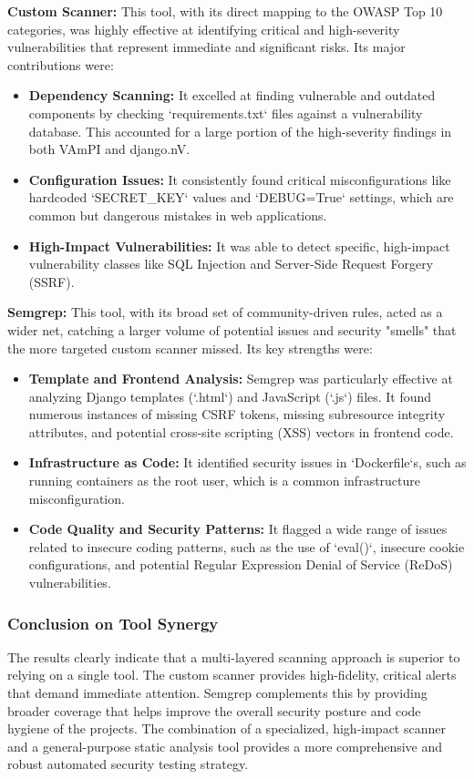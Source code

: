 \textbf{Custom Scanner:} This tool, with its direct mapping to the OWASP Top 10 categories, was highly effective at identifying critical and high-severity vulnerabilities that represent immediate and significant risks. Its major contributions were:
\begin{itemize}
    \item \textbf{Dependency Scanning:} It excelled at finding vulnerable and outdated components by checking `requirements.txt` files against a vulnerability database. This accounted for a large portion of the high-severity findings in both VAmPI and django.nV.
    \item \textbf{Configuration Issues:} It consistently found critical misconfigurations like hardcoded `SECRET\_KEY` values and `DEBUG=True` settings, which are common but dangerous mistakes in web applications.
    \item \textbf{High-Impact Vulnerabilities:} It was able to detect specific, high-impact vulnerability classes like SQL Injection and Server-Side Request Forgery (SSRF).
\end{itemize}

\textbf{Semgrep:} This tool, with its broad set of community-driven rules, acted as a wider net, catching a larger volume of potential issues and security "smells" that the more targeted custom scanner missed. Its key strengths were:
\begin{itemize}
    \item \textbf{Template and Frontend Analysis:} Semgrep was particularly effective at analyzing Django templates (`.html`) and JavaScript (`.js`) files. It found numerous instances of missing CSRF tokens, missing subresource integrity attributes, and potential cross-site scripting (XSS) vectors in frontend code.
    \item \textbf{Infrastructure as Code:} It identified security issues in `Dockerfile`s, such as running containers as the root user, which is a common infrastructure misconfiguration.
    \item \textbf{Code Quality and Security Patterns:} It flagged a wide range of issues related to insecure coding patterns, such as the use of `eval()`, insecure cookie configurations, and potential Regular Expression Denial of Service (ReDoS) vulnerabilities.
\end{itemize}

\subsubsection*{Conclusion on Tool Synergy}
The results clearly indicate that a multi-layered scanning approach is superior to relying on a single tool. The custom scanner provides high-fidelity, critical alerts that demand immediate attention. Semgrep complements this by providing broader coverage that helps improve the overall security posture and code hygiene of the projects. The combination of a specialized, high-impact scanner and a general-purpose static analysis tool provides a more comprehensive and robust automated security testing strategy.

